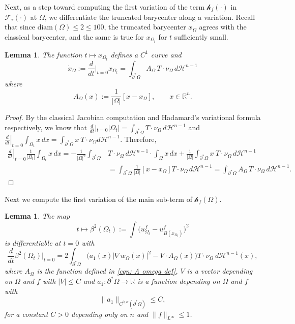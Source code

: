 \documentclass[10pt, reqno]{amsart}
\numberwithin{equation}{section}
\newtheorem{lemma}[theorem]{Lemma}
\def\R{{\mathbb R}}
\def\W{\Omega}
\def\err{\tau}
\def\Ep{\mathcal{F}_{\err}}
\def\nl{\mathscr{h}_f}
\begin{document}
Next, as a step toward computing the first variation of the term $\nl(\cdot)$ in $\Ep(\cdot)$ at $\W$, we differentiate the truncated barycenter along a variation. Recall that since $\text{diam}(\W) \leq 2 \leq 100$, the truncated barycenter $x_\W$ agrees with the classical barycenter, and the same is true for $x_{\W_t}$ for $t$ sufficiently small.
\begin{lemma}\label{lemma: Barycenter Derivative}
	 The function $t \mapsto x_{\Omega_{t}}$ defines a $C^1$ curve and 
\[
\dot{x}_\W :=\frac{d}{d t}\Big|_{t=0} x_{\Omega_t}=\int_{\partial^*\Omega} {A}_{\Omega} \, T \cdot \nu_{\Omega}\, d \mathcal{H}^{n-1}
\]
where 
\begin{equation}
    \label{eqn: A omega def}
{A}_{\Omega}(x):=\frac{1}{|\Omega|}[x- x_{\Omega}], \qquad x \in \R^n.
\end{equation}
\end{lemma}
\begin{proof}
	By the classical Jacobian computation and Hadamard's
variational formula respectively, we know that
$\frac{d}{d t}|_{t=0}|\Omega_t|  =\int_{\partial^* \Omega} T \cdot \nu_{\Omega} \, d \mathcal{H}^{n-1}$  and
$\left.\frac{d}{d t}\right|_{t=0} \int_{\Omega_t} x  \,dx =\int_{\partial^* \Omega} x \ T \cdot \nu_{\Omega} d \mathcal{H}^{n-1}$.
Therefore,
\begin{align*}
\left. \frac{d}{d t}\right|_{t=0} \frac{1}{\left|\Omega_{t}\right|} \int_{\Omega_{t}} x\, d x  =-\frac{1}{|\W|^2}\int_{\partial^* \Omega} &T \cdot \nu_{\Omega} \,d\mathcal{H}^{n-1} \cdot \int_{\Omega} x\,  d x+\frac{1}{|\Omega|} \int_{\partial^* \Omega} x\  T \cdot \nu_{\Omega} \, d \mathcal{H}^{n-1} \\
& =  \int_{\partial^* \Omega}  \frac{1}{|\W|}\left[x -x_\Omega \right]   T \cdot \nu_{\Omega}  \, d \mathcal{H}^{n-1}  =\int_{\partial^* \Omega} A_{\Omega}\,  T \cdot \nu_{\Omega} \, d \mathcal{H}^{n-1} .
\end{align*}
\end{proof}
%

Next we compute the first variation of the main sub-term of $\nl(\W)$.
\begin{lemma} \label{l:distterm}
 The map 
 \[
 t \mapsto \beta^2(\Omega_t):=\int \big(u_{\W_t}^f - u_{B(x_{\W_t})}^f \big)^2
 \]
 is differentiable at $t=0$ with  
 \[
 \frac{d}{dt} \beta^2(\W_t) \Bigr|_{t=0}=2\int_{\partial^* \W} \big( a_1(x) |\nabla w_{\W}(x)|^2 - V\cdot A_\W(x)\big) T\cdot \nu_\W \ d \mathcal{H}^{n-1}(x),
 \]
  where $A_\W$ is the function defined in \eqref{eqn: A omega def}, $V$ is a vector depending on $\W$ and $f$ with $|V|\leq C$ and $a_1: \partial^*\W \to \R$ is a function depending on $\W$ and $f$ with
 \[
 \|a_1 \|_{C^{0,\alpha}(\partial^* \W)} \leq C,
 \]
for a constant $C>0$ depending only on $n$ and  $\| f\|_{L^{\infty}} \leq 1$. 
\end{lemma}
\end{document}
